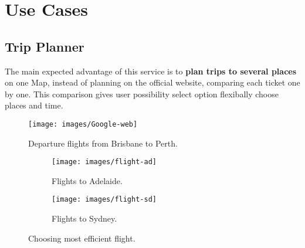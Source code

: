 \documentclass[12pt]{article}
\numberwithin{equation}{section} %
\numberwithin{figure}{section} %
\numberwithin{table}{section} %
\begin{document}
\section{Use Cases}
	\subsection{Trip Planner}
		The main expected advantage of this service is to \textbf{plan trips to several places} on one Map, instead of planning on the official website, comparing each ticket one by one. This comparison gives user possibility select option flexibally choose places and time.
		
		\begin{figure}[H]
			\centering        
			\texttt{[image: images/Google-web]}
			\caption{Departure flights from Brisbane to Perth.}
			\label{fig:webCam}
		\end{figure}
		\begin{figure}[H]
			\begin{subfigure}[b]{0.52\textwidth}
				\centering
				\texttt{[image: images/flight-ad]}
				\caption{Flights to Adelaide.}
				
			\end{subfigure}
			\begin{subfigure}[b]{0.52\textwidth}
				\centering
				\texttt{[image: images/flight-sd]}
				\caption{Flights to Sydney.}
				
			\end{subfigure}
			\caption{Choosing most efficient flight.}
		\end{figure}
\end{document}

